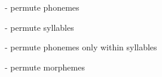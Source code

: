 - permute phonemes

- permute syllables

- permute phonemes only within syllables

- permute morphemes 

